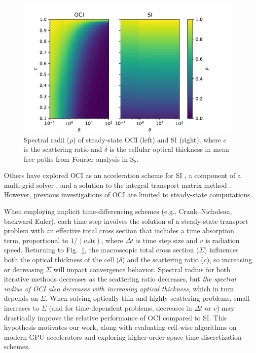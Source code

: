\begin{figure}
    \centering
    \includegraphics[width=\textwidth]{deterministic/therefore_paper/therefore_figs/ss_specrads.pdf}
    \caption{Spectral radii (${\rho}$) of steady-state OCI (left) and SI (right), where $c$ is the scattering ratio and ${\delta}$ is the cellular optical thickness in mean free paths from Fourier analysis in S$_8$.}
    \label{fig:ss-sepcrad}
\end{figure}

Others have explored OCI as an acceleration scheme for SI \cite{ hoagland_hybrid_2021}, a component of a multi-grid solver \cite{man1995multigrid1, man1996multigrid2}, and a solution to the integral transport matrix method \cite{raffi2108pidotscom}.
However, previous investigations of OCI are limited to steady-state computations.

When employing implicit time-differencing schemes (e.g., Crank--Nicholson, backward Euler), each time step involves the solution of a steady-state transport problem with an effective total cross section that includes a time absorption term, proportional to $1/(v \Delta t)$, where $\Delta t$ is time step size and $v$ is radiation speed.
Returning to Fig.~\ref{fig:ss-sepcrad}, the macroscopic total cross section ($\Sigma$) influences both the optical thickness of the cell ($\delta$) and the scattering ratio ($c$), so increasing or decreasing $\Sigma$ will impact convergence behavior.
Spectral radius for both iterative methods decreases as the scattering ratio decreases, but \textit{the spectral radius of OCI also decreases with increasing optical thickness}, which in turn depends on $\Sigma$.
When solving optically thin and highly scattering problems, small increases to $\Sigma$ (and for time-dependent problems, decreases in $\Delta t$ or $v$) may drastically improve the relative performance of OCI compared to SI.
This hypothesis motivates our work, along with evaluating cell-wise algorithms on modern GPU accelerators and exploring higher-order space-time discretization schemes.

